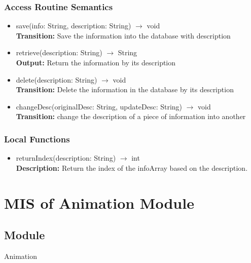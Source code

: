 \documentclass[12pt, titlepage]{article}
\begin{document}
\subsubsection{Access Routine Semantics}

\begin{itemize}
\item save(info: String, description: String) $\rightarrow$ void\\
\textbf{Transition:} Save the information into the database with description

\item retrieve(description: String) $\rightarrow$ String\\
\textbf{Output:} Return the information by its description

\item delete(description: String) $\rightarrow$ void\\
\textbf{Transition:} Delete the information in the database by its description

\item changeDesc(originalDesc: String, updateDesc: String) $\rightarrow$ void\\
\textbf{Transition:} change the description of a piece of information into another

\end{itemize}


\subsubsection{Local Functions}
\begin{itemize}
\item returnIndex(description: String) $\rightarrow$ int\\
\textbf{Description:} Return the index of the infoArray based on the description. 
\end{itemize}







\section{MIS of Animation Module} 

\subsection{Module}
\hspace{1.5em}Animation
\end{document}
